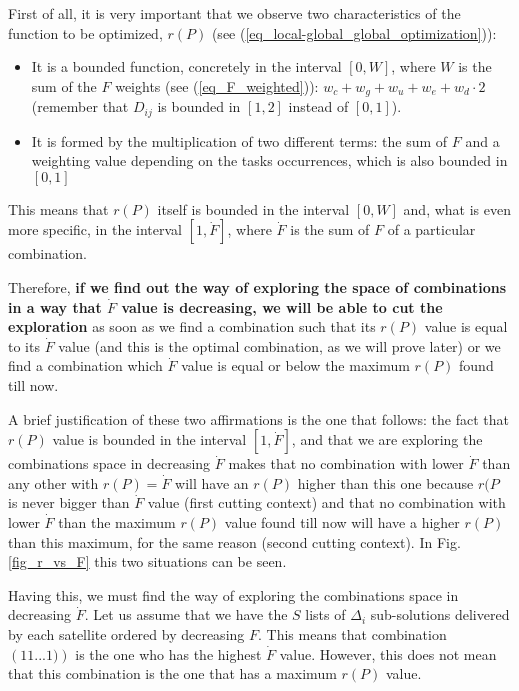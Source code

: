 First of all, it is very important that we observe two characteristics of the function to be optimized, $r(P)$ (see (\ref{eq_local-global_global_optimization})):
\begin{itemize}
\item It is a bounded function, concretely in the interval $\left[0, W\right]$, where $W$ is the sum of the $F$ weights (see (\ref{eq_F_weighted})): $w_c + w_g + w_u + w_e + w_d\cdot 2$ (remember that $D_{ij}$ is bounded in $\left[1, 2\right]$ instead of $\left[0, 1\right]$).
\item It is formed by the multiplication of two different terms: the sum of $F$ and a weighting value depending on the tasks occurrences, which is also bounded in $\left[0, 1\right]$
\end{itemize}

This means that $r(P)$ itself is bounded in the interval $\left[0, W\right]$ and, what is even more specific, in the interval $\left[1, \dot{F}\right]$, where $\dot{F}$ is the sum of $F$ of a particular combination.

Therefore, \textbf{if we find out the way of exploring the space of combinations in a way that $\dot{F}$ value is decreasing, we will be able to cut the exploration} as soon as we find a combination such that its $r(P)$ value is equal to its $\dot{F}$ value (and this is the optimal combination, as we will prove later) or we find a combination which $\dot{F}$ value is equal or below the maximum $r(P)$ found till now.

A brief justification of these two affirmations is the one that follows: the fact that $r(P)$ value is bounded in the interval $\left[1, \dot{F}\right]$, and that we are exploring the combinations space in decreasing $\dot{F}$ makes that no combination with lower $\dot{F}$ than any other with $r(P) = \dot{F}$ will have an $r(P)$ higher than this one because $r(P$ is never bigger than $\dot{F}$ value (first cutting context) and that no combination with lower $\dot{F}$ than the maximum $r(P)$ value found till now will have a higher $r(P)$ than this maximum, for the same reason (second cutting context). In Fig. \ref{fig_r_vs_F} this two situations can be seen.

Having this, we must find the way of exploring the combinations space in decreasing $\dot{F}$. Let us assume that we have the $S$ lists of $\Delta_i$ sub-solutions delivered by each satellite ordered by decreasing $F$. This means that combination $\left(1 1 ... 1)\right)$ is the one who has the highest $\dot{F}$ value. However, this does not mean that this combination is the one that has a maximum $r(P)$ value.

